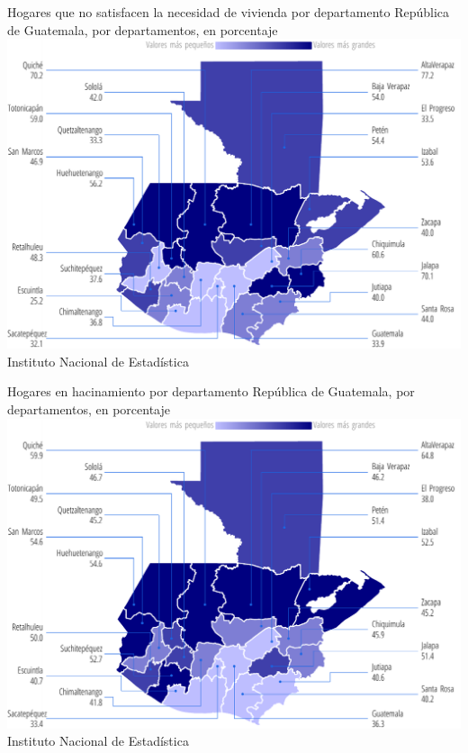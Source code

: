       {%
      }%
      {%
      	Hogares que no satisfacen la necesidad de vivienda por departamento
      } %
      {%
      	República de Guatemala, por departamentos, en porcentaje} %
      {%
      	\includegraphics[width=52\cuadri]{graficas/1_12.pdf}}%
      {%
      	Instituto Nacional de Estadística} %
      
      
        
        {%
        }%
        {%
        	Hogares en hacinamiento por departamento
        } %
        {%
        	República de Guatemala, por departamentos, en porcentaje} %
        {%
        	\includegraphics[width=52\cuadri]{graficas/1_13.pdf}}%
        {%
        	Instituto Nacional de Estadística} %
        
